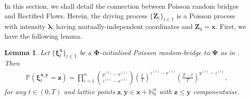 \documentclass{article}
\newtheorem{lem}[thm]{Lemma}
\def\T{\mathbb{T}}
\def\xib{\boldsymbol{\xi}}
\theoremstyle{definition}
\begin{document}
In this section, we shall detail the connection between Poisson random bridges and Rectified Flows. Herein, the driving process $\{\boldsymbol{Z}_t\}_{t\in\T}$ is a Poisson process with intensity $\boldsymbol{\lambda}$, having mutually-independent coordinates and $\boldsymbol{Z}_0 = \boldsymbol{x}$. First, we have the following lemma.
\begin{lem}\label{lem:poisson-product-binomial}
Let $\{\xib^{\boldsymbol{x}}_t\}_{t\in\T}$ be a $\boldsymbol{\Phi}$-initialised Poisson random-bridge to $\boldsymbol{\Psi}$ as in \cite{goria_random-bridges_2025}. Then
\begin{align}
\mathbb{P}(\xib^{\boldsymbol{x},\boldsymbol{y}}_t = \boldsymbol{z}) = \prod_{i=1}^n {{y^{(i)} - x^{(i)}}\choose{z^{(i)} - x^{(i)}}}  \left(\frac{t}{T}\right)^{z^{(i)} - x^{(i)}}\left(\frac{T-t}{T}\right)^{y^{(i)} - z^{(i)}}, \label{poissonbridgedist}
\end{align}
for any $t\in(0,T)$ and lattice points $\boldsymbol{z}, \boldsymbol{y} \in \boldsymbol{x} + \mathbb{N}_0^n$ with $\boldsymbol{z} \leq \boldsymbol{y}$ componentwise.
\end{lem}
\end{document}
